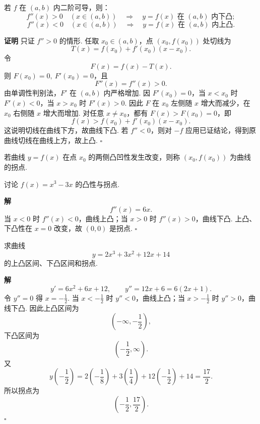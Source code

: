 \documentclass[fontset=fandol]{ctexart}
\newenvironment{proofdetail}{\par\noindent\textbf{证明}\quad}{\hfill$\square$\par\vspace{0.8em}}
\newenvironment{solution}{\par\noindent\textbf{解}\quad}{\hfill$\square$\par\vspace{0.8em}}
\begin{document}
\begin{theorem}[二阶导数判别凸性]
若 $f$ 在 $(a,b)$ 内二阶可导，则：
\[
f''(x)>0\quad (x\in(a,b))\quad\Longrightarrow\quad y=f(x)\text{ 在 }(a,b)\text{ 内下凸};
\]
\[
f''(x)<0\quad (x\in(a,b))\quad\Longrightarrow\quad y=f(x)\text{ 在 }(a,b)\text{ 内上凸}.
\]
\end{theorem}
\begin{proofdetail}
只证 $f''>0$ 的情形. 任取 $x_0\in(a,b)$，点 $(x_0,f(x_0))$ 处切线为
\[
T(x)=f(x_0)+f'(x_0)(x-x_0).
\]
令
\[
F(x)=f(x)-T(x).
\]
则 $F(x_0)=0,\ F'(x_0)=0$，且
\[
F''(x)=f''(x)>0.
\]
由单调性判别法，$F'$ 在 $(a,b)$ 内严格增加. 因 $F'(x_0)=0$，当 $x<x_0$ 时 $F'(x)<0$，当 $x>x_0$ 时 $F'(x)>0$. 因此 $F$ 在 $x_0$ 左侧随 $x$ 增大而减少，在 $x_0$ 右侧随 $x$ 增大而增加. 对任意 $x\neq x_0$，都有 $F(x)>F(x_0)=0$，即
\[
f(x)>f(x_0)+f'(x_0)(x-x_0).
\]
这说明切线在曲线下方，故曲线下凸. 若 $f''<0$，则对 $-f$ 应用已证结论，得到原曲线切线在曲线上方，故上凸.
\end{proofdetail}

\begin{definition}[拐点]
若曲线 $y=f(x)$ 在点 $x_0$ 的两侧凸凹性发生改变，则称 $(x_0,f(x_0))$ 为曲线的拐点.
\end{definition}

\begin{center}
\end{center}

\begin{example}[凸性与拐点]
讨论 $f(x)=x^3-3x$ 的凸性与拐点.
\end{example}
\begin{solution}
\[
f''(x)=6x.
\]
当 $x<0$ 时 $f''(x)<0$，曲线上凸；当 $x>0$ 时 $f''(x)>0$，曲线下凸. 上凸、下凸性在 $x=0$ 改变，故 $(0,0)$ 是拐点.
\end{solution}

\begin{example}[凸性与拐点]
求曲线
\[
y=2x^3+3x^2+12x+14
\]
的上凸区间、下凸区间和拐点.
\end{example}
\begin{solution}
\[
y'=6x^2+6x+12,\qquad y''=12x+6=6(2x+1).
\]
令 $y''=0$ 得 $x=-\frac12$. 当 $x<-\frac12$ 时 $y''<0$，曲线上凸；当 $x>-\frac12$ 时 $y''>0$，曲线下凸. 因此上凸区间为
\[
\left(-\infty,-\frac12\right),
\]
下凸区间为
\[
\left(-\frac12,\infty\right).
\]
又
\[
y\left(-\frac12\right)=2\left(-\frac18\right)+3\left(\frac14\right)+12\left(-\frac12\right)+14
=\frac{17}{2}.
\]
所以拐点为
\[
\left(-\frac12,\frac{17}{2}\right).
\]
\end{solution}
\end{document}
